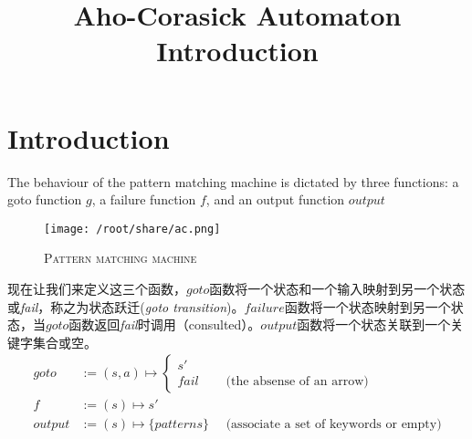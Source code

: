 \documentclass{article}
\begin{document}
\title{Aho-Corasick Automaton Introduction}
\author{}
\maketitle

\section{Introduction}
The behaviour of the pattern matching machine is dictated by three functions: a goto function $g$, a failure function $f$, and an output function $output$

\begin{figure}[h]
  \centering
\caption{\textsc{Pattern matching machine}}
\texttt{[image: /root/share/ac.png]}
\end{figure}

现在让我们来定义这三个函数，$goto$函数将一个状态和一个输入映射到另一个状态或\emph{fail}，称之为状态跃迁(\textit{goto transition})。$failure$函数将一个状态映射到另一个状态，当$goto$函数返回\emph{fail}时调用（consulted）。$output$函数将一个状态关联到一个关键字集合或空。
\begin{align*}
goto    &:= (s,a) \mapsto
\begin{cases}
 s' \\
fail & \quad \text{ (the absense of an arrow)}
\end{cases}\\
f       &:= (s) \mapsto s'\\
output  &:= (s) \mapsto \{patterns\} \quad \text{ (associate a set of keywords or empty)}\\
\end{align*}
\end{document}
